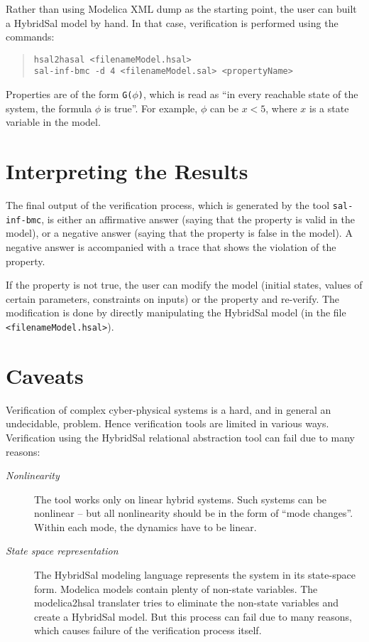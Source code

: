 \documentclass{article}
\begin{document}
Rather than using Modelica XML dump as the starting point, the user
can built a HybridSal model by hand.  In that case, verification is performed
using the commands:
\begin{quote}
 {\tt{hsal2hasal  <filenameModel.hsal>}}
\\
 {\tt{sal-inf-bmc -d 4 <filenameModel.sal> <propertyName>}}
\end{quote}

Properties are of the form {\tt{G($\phi$)}}, which is read as
``in every reachable state of the system, the formula $\phi$ is true''.
For example, $\phi$ can be $x < 5$, where $x$ is a state variable in 
the model.

\section{Interpreting the Results}

The final output of the verification process, which is generated by the tool
 {\tt{sal-inf-bmc}}, is either an affirmative answer (saying that the property
is valid in the model), or a negative answer (saying that the property is
false in the model).  A negative answer is accompanied with a trace that shows
the violation of the property.

If the property is not true, the user can modify the model 
(initial states, values of certain parameters, constraints on inputs)
or the property  and re-verify.  The modification is done by directly
manipulating the HybridSal model (in the file {\tt{<filenameModel.hsal>}}).




\section{Caveats}

Verification of complex cyber-physical systems is a hard,
and in general an undecidable, problem.  
Hence verification tools are limited in various ways.
Verification using the HybridSal relational abstraction tool
can fail due to many reasons:
\begin{description}
\item[{\em{Nonlinearity}}]
The tool works only on linear hybrid systems.  Such systems can be
nonlinear -- but all nonlinearity should be in the form of ``mode changes''.
Within each mode, the dynamics have to be linear.
\item[{\em{State space representation}}]
The HybridSal modeling language represents the system in its state-space
form.  Modelica models contain plenty of non-state variables.
The modelica2hsal translater tries to eliminate the non-state variables
and create a HybridSal model.  But this process can fail due to many 
reasons, which causes failure of the verification process itself.
\end{description}
\end{document}
